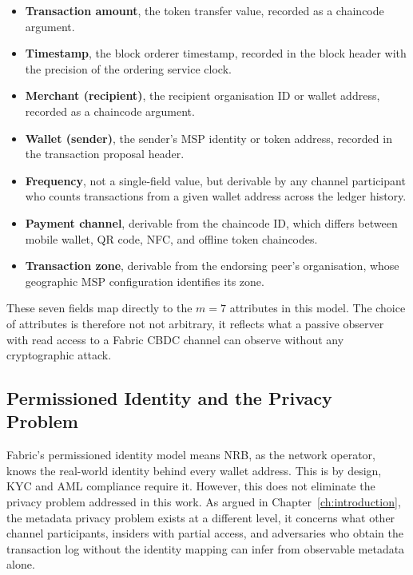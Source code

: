 \begin{itemize}
    \item \textbf{Transaction amount}, the token transfer
    value, recorded as a chaincode argument.

    \item \textbf{Timestamp}, the block orderer timestamp,
    recorded in the block header with the precision of the
    ordering service clock.

    \item \textbf{Merchant (recipient)}, the recipient
    organisation ID or wallet address, recorded as a chaincode
    argument.

    \item \textbf{Wallet (sender)}, the sender's MSP
    identity or token address, recorded in the transaction
    proposal header.

    \item \textbf{Frequency}, not a single-field value,
    but derivable by any channel participant who counts
    transactions from a given wallet address across the
    ledger history.

    \item \textbf{Payment channel}, derivable from the
    chaincode ID, which differs between mobile wallet,
    QR code, NFC, and offline token chaincodes.

    \item \textbf{Transaction zone}, derivable from the
    endorsing peer's organisation, whose geographic MSP
    configuration identifies its zone.
\end{itemize}

These seven fields map directly to the $m = 7$ attributes
in this model. The choice of attributes is therefore not
not arbitrary, it reflects what a passive observer with read
access to a Fabric CBDC channel can observe without any
cryptographic attack.

\subsection{Permissioned Identity and the Privacy Problem}

Fabric's permissioned identity model means NRB, as the
network operator, knows the real-world identity behind every
wallet address. This is by design, KYC and AML compliance
require it. However, this does not eliminate the privacy
problem addressed in this work. As argued in
Chapter~\ref{ch:introduction}, the metadata privacy problem
exists at a different level, it concerns what other
channel participants, insiders with partial access, and
adversaries who obtain the transaction log without the
identity mapping can infer from observable metadata alone.

